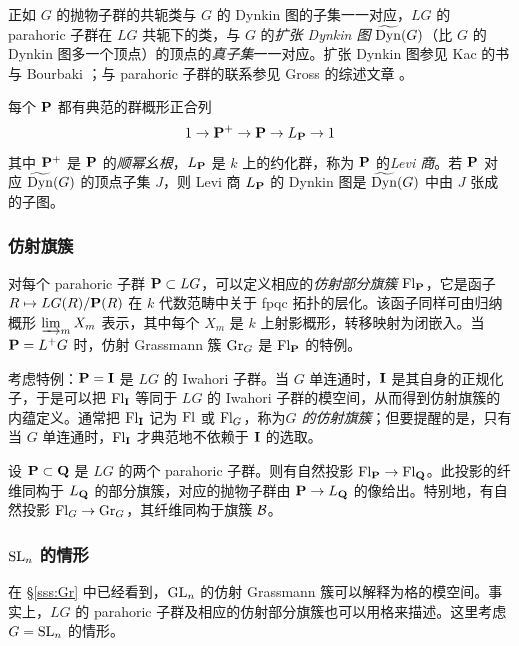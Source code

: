 正如 $G$ 的抛物子群的共轭类与 $G$ 的 Dynkin 图的子集一一对应，$LG$ 的 parahoric 子群在 $LG$ 共轭下的类，与 $G$ 的{\em 扩张 Dynkin 图} $\widetilde{\operatorname{Dyn}}(G)$（比 $G$ 的 Dynkin 图多一个顶点）的顶点的{\em 真子集}一一对应。扩张 Dynkin 图参见 Kac 的书 \cite[\S4.8]{Kac} 与 Bourbaki \cite[Ch VI]{Bourbaki}；与 parahoric 子群的联系参见 Gross 的综述文章 \cite{Gross}。

每个 $\mathbf{P}$ 都有典范的群概形正合列
\begin{equation*}
1\to \mathbf{P}^{+}\to \mathbf{P}\to L_{\mathbf{P}}\to1
\end{equation*}
其中 $\mathbf{P}^{+}$ 是 $\mathbf{P}$ 的{\em 顺幂幺根}，$L_{\mathbf{P}}$ 是 $k$ 上的约化群，称为 $\mathbf{P}$ 的{\em Levi 商}。若 $\mathbf{P}$ 对应 $\widetilde{\operatorname{Dyn}}(G)$ 的顶点子集 $J$，则 Levi 商 $L_{\mathbf{P}}$ 的 Dynkin 图是 $\widetilde{\operatorname{Dyn}}(G)$ 中由 $J$ 张成的子图。

\subsubsection{仿射旗簇} 对每个 parahoric 子群 $\mathbf{P}\subset LG$，可以定义相应的{\em 仿射部分旗簇} $\textup{Fl}_{\mathbf{P}}$，它是函子 $R\mapsto LG(R)/\mathbf{P}(R)$ 在 $k$ 代数范畴中关于 fpqc 拓扑的层化。该函子同样可由归纳概形 $\varinjlim_{m}X_{m}$ 表示，其中每个 $X_{m}$ 是 $k$ 上射影概形，转移映射为闭嵌入。当 $\mathbf{P}=L^{+}G$ 时，仿射 Grassmann 簇 $\textup{Gr}_{G}$ 是 $\textup{Fl}_{\mathbf{P}}$ 的特例。

考虑特例：$\mathbf{P}=\mathbf{I}$ 是 $LG$ 的 Iwahori 子群。当 $G$ 单连通时，$\mathbf{I}$ 是其自身的正规化子，于是可以把 $\textup{Fl}_{\mathbf{I}}$ 等同于 $LG$ 的 Iwahori 子群的模空间，从而得到仿射旗簇的内蕴定义。通常把 $\textup{Fl}_{\mathbf{I}}$ 记为 $\textup{Fl}$ 或 $\textup{Fl}_{G}$，称为{\em $G$ 的仿射旗簇}；但要提醒的是，只有当 $G$ 单连通时，$\textup{Fl}_{\mathbf{I}}$ 才典范地不依赖于 $\mathbf{I}$ 的选取。

设 $\mathbf{P}\subset\mathbf{Q}$ 是 $LG$ 的两个 parahoric 子群。则有自然投影 $\textup{Fl}_{\mathbf{P}}\to \textup{Fl}_{\mathbf{Q}}$。此投影的纤维同构于 $L_{\mathbf{Q}}$ 的部分旗簇，对应的抛物子群由 $\mathbf{P}\to L_{\mathbf{Q}}$ 的像给出。特别地，有自然投影 $\textup{Fl}_{G}\to \textup{Gr}_{G}$，其纤维同构于旗簇 $\mathcal{B}$。

\subsubsection{$\textup{SL}_{n}$ 的情形}\label{sss:GLn parahoric} 在 \S\ref{sss:Gr} 中已经看到，$\textup{GL}_{n}$ 的仿射 Grassmann 簇可以解释为格的模空间。事实上，$LG$ 的 parahoric 子群及相应的仿射部分旗簇也可以用格来描述。这里考虑 $G=\textup{SL}_{n}$ 的情形。

